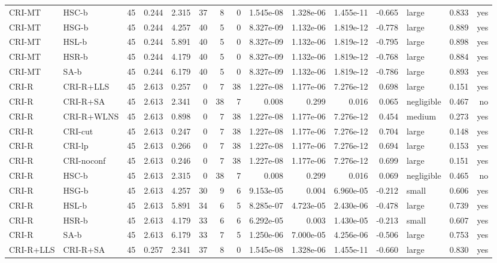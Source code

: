 \begin{table}[htbp]
\begin{tabular}{llrrrrrrrrrrlrr}
CRI-MT & HSC-b & 45 & 0.244 & 2.315 & 37 & 8 & 0 & 1.545e-08 & 1.328e-06 & 1.455e-11 & -0.665 & large & 0.833 & yes \\
CRI-MT & HSG-b & 45 & 0.244 & 4.257 & 40 & 5 & 0 & 8.327e-09 & 1.132e-06 & 1.819e-12 & -0.778 & large & 0.889 & yes \\
CRI-MT & HSL-b & 45 & 0.244 & 5.891 & 40 & 5 & 0 & 8.327e-09 & 1.132e-06 & 1.819e-12 & -0.795 & large & 0.898 & yes \\
CRI-MT & HSR-b & 45 & 0.244 & 4.179 & 40 & 5 & 0 & 8.327e-09 & 1.132e-06 & 1.819e-12 & -0.768 & large & 0.884 & yes \\
CRI-MT & SA-b & 45 & 0.244 & 6.179 & 40 & 5 & 0 & 8.327e-09 & 1.132e-06 & 1.819e-12 & -0.786 & large & 0.893 & yes \\
CRI-R & CRI-R+LLS & 45 & 2.613 & 0.257 & 0 & 7 & 38 & 1.227e-08 & 1.177e-06 & 7.276e-12 & 0.698 & large & 0.151 & yes \\
CRI-R & CRI-R+SA & 45 & 2.613 & 2.341 & 0 & 38 & 7 & 0.008 & 0.299 & 0.016 & 0.065 & negligible & 0.467 & no \\
CRI-R & CRI-R+WLNS & 45 & 2.613 & 0.898 & 0 & 7 & 38 & 1.227e-08 & 1.177e-06 & 7.276e-12 & 0.454 & medium & 0.273 & yes \\
CRI-R & CRI-cut & 45 & 2.613 & 0.247 & 0 & 7 & 38 & 1.227e-08 & 1.177e-06 & 7.276e-12 & 0.704 & large & 0.148 & yes \\
CRI-R & CRI-lp & 45 & 2.613 & 0.266 & 0 & 7 & 38 & 1.227e-08 & 1.177e-06 & 7.276e-12 & 0.694 & large & 0.153 & yes \\
CRI-R & CRI-noconf & 45 & 2.613 & 0.246 & 0 & 7 & 38 & 1.227e-08 & 1.177e-06 & 7.276e-12 & 0.699 & large & 0.151 & yes \\
CRI-R & HSC-b & 45 & 2.613 & 2.315 & 0 & 38 & 7 & 0.008 & 0.299 & 0.016 & 0.069 & negligible & 0.465 & no \\
CRI-R & HSG-b & 45 & 2.613 & 4.257 & 30 & 9 & 6 & 9.153e-05 & 0.004 & 6.960e-05 & -0.212 & small & 0.606 & yes \\
CRI-R & HSL-b & 45 & 2.613 & 5.891 & 34 & 6 & 5 & 8.285e-07 & 4.723e-05 & 2.430e-06 & -0.478 & large & 0.739 & yes \\
CRI-R & HSR-b & 45 & 2.613 & 4.179 & 33 & 6 & 6 & 6.292e-05 & 0.003 & 1.430e-05 & -0.213 & small & 0.607 & yes \\
CRI-R & SA-b & 45 & 2.613 & 6.179 & 33 & 7 & 5 & 1.250e-06 & 7.000e-05 & 4.256e-06 & -0.506 & large & 0.753 & yes \\
CRI-R+LLS & CRI-R+SA & 45 & 0.257 & 2.341 & 37 & 8 & 0 & 1.545e-08 & 1.328e-06 & 1.455e-11 & -0.660 & large & 0.830 & yes \\

\end{tabular}
\end{table}
